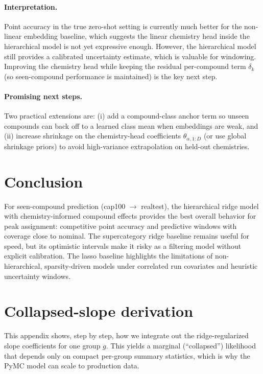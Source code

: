 \documentclass[11pt]{article}
\begin{document}
\paragraph{Interpretation.}
Point accuracy in the true zero-shot setting is currently much better for the non-linear embedding baseline, which
suggests the linear chemistry head inside the hierarchical model is not yet expressive enough. However, the hierarchical
model still provides a calibrated uncertainty estimate, which is valuable for windowing. Improving the chemistry head
while keeping the residual per-compound term $\delta_k$ (so seen-compound performance is maintained) is the key next step.

\paragraph{Promising next steps.}
Two practical extensions are: (i) add a compound-class anchor term so unseen compounds can back off to a learned class
mean when embeddings are weak, and (ii) increase shrinkage on the chemistry-head coefficients $\theta_{\alpha,1:D}$
(or use global shrinkage priors) to
avoid high-variance extrapolation on held-out chemistries.

\section{Conclusion}

For seen-compound prediction (cap100 $\rightarrow$ realtest), the hierarchical ridge model with chemistry-informed
compound effects provides the best overall behavior for peak assignment: competitive point accuracy and predictive
windows with coverage close to nominal. The supercategory ridge baseline remains useful for speed, but its optimistic
intervals make it risky as a filtering model without explicit calibration. The lasso baseline highlights the limitations of
non-hierarchical, sparsity-driven models under correlated run covariates and heuristic uncertainty windows.

\appendix

\section{Collapsed-slope derivation}
\label{app:collapsed_slopes}

This appendix shows, step by step, how we integrate out the ridge-regularized slope coefficients for one group $g$.
This yields a marginal (``collapsed'') likelihood that depends only on compact per-group summary statistics, which is why
the PyMC model can scale to production data.
\end{document}
